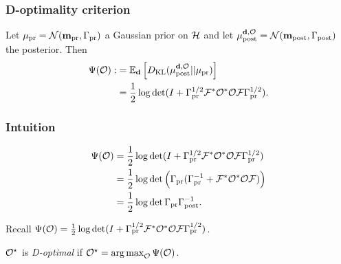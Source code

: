 \documentclass{beamer}
\begin{document}
\begin{frame}
  \frametitle{D-optimality criterion}
  \begin{theorem}\label{thm:d optimality}
    Let \(\mu_{\textup{pr}} = \mathcal{N}(\mathbf{m}_{\textup{pr}},\Gamma_{\textup{pr}})\) a Gaussian prior on \(\mathcal{H}\)
    and let \(\mu_{\textup{post}}^{\mathbf{d}, \mathcal{O}} = \mathcal{N}(\mathbf{m}_{\textup{post}},\Gamma_{\textup{post}})\) the posterior.
    Then
    \begin{align*}
      \begin{split}
        \Psi( \mathcal{O}) :&= \mathbb{E}_{\mathbf{d}}\left [ D_{\text{KL}} (\mu_{\textup{post}}^{\mathbf{d}, \mathcal{O}} || \mu_{\textup{pr}} ) \right ] \\
        &= \frac12 \log \det 
        ( I +  \Gamma_{\textup{pr}}^{1/2}  \mathcal{F} ^* \mathcal{O}^* \mathcal{O} \mathcal{F} \Gamma_{\textup{pr}}^{1/2}).
      \end{split}
    \end{align*}
  \end{theorem}

\end{frame}

\begin{frame}
  \frametitle{Intuition}
  \begin{align*}
  \begin{split}
    \Psi(\mathcal{O}) &= \frac12 \log \det ( I + \Gamma_{\textup{pr}}^{1/2}  \mathcal{F} ^* \mathcal{O}^* \mathcal{O} \mathcal{F} \Gamma_{\textup{pr}}^{1/2})\\ 
    &= \frac12 \log \det \Big( \Gamma_{\textup{pr}} ( \Gamma_{\textup{pr}}^{-1} +  \mathcal{F} ^* \mathcal{O}^* \mathcal{O} \mathcal{F}) \Big )\\
    &= \frac12 \log \det \Gamma_{\textup{pr}} \Gamma_{\textup{post}}^{-1}.
  \end{split}
  \end{align*}
\end{frame}


\begin{frame}
  Recall \(\Psi( \mathcal{O}) = \frac12 \log \det ( I + 
  \Gamma_{\textup{pr}}^{1/2} \mathcal{F} ^* \mathcal{O}^* \mathcal{O} \mathcal{F} \Gamma_{\textup{pr}}^{1/2})\).

  \begin{definition}
  \(\mathcal{O}^{\star}\) is \emph{D-optimal} if \(\mathcal{O}^{\star} =
  \operatorname*{arg\,max}_{\mathcal{O}} \Psi(\mathcal{O})\).
  \end{definition}
  

\end{frame}
\end{document}
